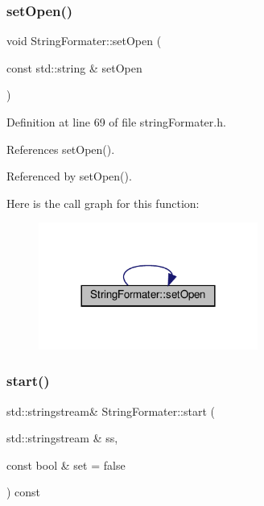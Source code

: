 \subsubsection{\texorpdfstring{set\+Open()}{setOpen()}\hspace{0.1cm}{\footnotesize\ttfamily [2/2]}}
{\footnotesize\ttfamily void String\+Formater\+::set\+Open (\begin{DoxyParamCaption}\item[{const std\+::string \&}]{set\+Open }\end{DoxyParamCaption})\hspace{0.3cm}{\ttfamily [inline]}}



Definition at line 69 of file string\+Formater.\+h.



References set\+Open().



Referenced by set\+Open().

Here is the call graph for this function\+:
\nopagebreak
\begin{figure}[H]
\begin{center}
\leavevmode
\includegraphics[width=204pt]{classStringFormater_a2b7df7412f7e0993532525aed90ca258_cgraph}
\end{center}
\end{figure}
\mbox{\label{classStringFormater_a4eda27368789110bef0e4c3401587efd}} 
\subsubsection{\texorpdfstring{start()}{start()}\hspace{0.1cm}{\footnotesize\ttfamily [1/2]}}
{\footnotesize\ttfamily std\+::stringstream\& String\+Formater\+::start (\begin{DoxyParamCaption}\item[{std\+::stringstream \&}]{ss,  }\item[{const bool \&}]{set = {\ttfamily false} }\end{DoxyParamCaption}) const\hspace{0.3cm}{\ttfamily [inline]}}



